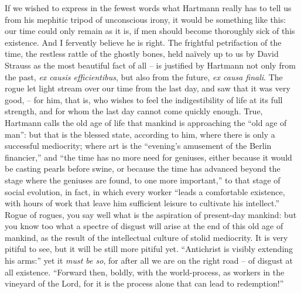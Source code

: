 If we wished to express in the fewest words what Hartmann really has
to tell us from his mephitic tripod of unconscious irony, it would be
something like this: our time could only remain as it is, if men
should become thoroughly sick of this existence. And I fervently
believe he is right. The frightful petrifaction of the time, the
restless rattle of the ghostly bones, held naïvely up to us by David
Strauss as the most beautiful fact of all -- is justified by Hartmann
not only from the past, \textit{ex causis efficientibus}, but also from the
future, \textit{ex causa finali}. The rogue let light stream over our time
from the last day, and saw that it was very good, -- for him, that is,
who wishes to feel the indigestibility of life at its full strength,
and for whom the last day cannot come quickly enough. True, Hartmann
calls the old age of life that mankind is approaching the \enquote{old age of
man}: but that is the blessed state, according to him, where there is
only a successful mediocrity; where art is the \enquote{evening's amusement
of the Berlin financier,} and \enquote{the time has no more need for
geniuses, either because it would be casting pearls before swine, or
because the time has advanced beyond the stage where the geniuses are
found, to one more important,} to that stage of social evolution, in
fact, in which every worker \enquote{leads a comfortable existence, with
hours of work that leave him sufficient leisure to cultivate his
intellect.} Rogue of rogues, you say well what is the aspiration of
present-day mankind: but you know too what a spectre of disgust will
arise at the end of this old age of mankind, as the result of the
intellectual culture of stolid mediocrity. It is very pitiful to see,
but it will be still more pitiful yet. \enquote{Antichrist is visibly
extending his arms:} yet it \textit{must be so}, for after all we are on the
right road -- of disgust at all existence. \enquote{Forward then, boldly, with
the world-process, as workers in the vineyard of the Lord, for it is
the process alone that can lead to redemption!}

